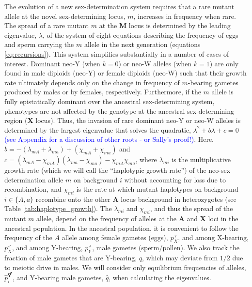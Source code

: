 \documentclass[10pt,letterpaper]{article}
\begin{document}
The evolution of a new sex-determination system requires that a rare mutant allele at the novel sex-determining locus, $m$, increases in frequency when rare. 
The spread of a rare mutant $m$ at the \textbf{M} locus is determined by the leading eigenvalue, $\lambda$, of the system of eight equations describing the frequency of eggs and sperm carrying the $m$ allele in the next generation (equations \ref{eq:recursions}). %
This system simplifies substantially in a number of cases of interest. 
Dominant neo-Y (when $k=0$) or neo-W alleles (when $k=1$) are only found in male diploids (neo-Y) or female diploids (neo-W) such that their growth rate ultimately depends only on the change in frequency of $m$-bearing gametes produced by males or by females, respectively. 
Furthermore, if the $m$ allele is fully epistatically dominant over the ancestral sex-determining system, phenotypes are not affected by the genotype at the ancestral sex-determining region (\textbf{X} locus). 
Thus, the invasion of rare dominant neo-Y or neo-W alleles is determined by the largest eigenvalue that solves the quadratic, $\lambda^2+ b \lambda + c =0$ \textcolor{blue}{(see Appendix for a discussion of other roots - or Sally's proof!)}.
Here, $b= - (\lambda_{mA} + \lambda_{ma})+(\chi_{mA} + \chi_{ma})$ and $c = (\lambda_{mA}-\chi_{mA}) (\lambda_{ma}-\chi_{ma}) -\chi_{mA} \chi_{ma}$, where $\lambda_{mi}$ is the multiplicative growth rate (which we will call the ``haplotypic growth rate'') of the neo-sex determination allele $m$ on background $i$ without accounting for loss due to recombination, and $\chi_{mi}$ is the rate at which mutant haplotypes on background $i\in\{A,a\}$ recombine onto the other \textbf{A} locus background in heterozygotes (see Table \ref{tab:haplotype_growth}).
The $\lambda_{mi}$ and $\chi_{mi}$, and thus the spread of the mutant $m$ allele, depend on the frequency of alleles at the \textbf{A} and \textbf{X} loci in the ancestral population. 
In the ancestral population, it is convenient to follow the frequency of the $A$ allele among female gametes (eggs), $p^\female_X$, and among X-bearing, $p^\male_X$, and among Y-bearing, $p^\male_Y$, male gametes (sperm/pollen). 
We also track the fraction of male gametes that are Y-bearing, $q$, which may deviate from $1/2$ due to meiotic drive in males. 
We will consider only equilibrium frequencies of alleles, $\hat{p}^\Hermaphrodite_i$, and Y-bearing male gametes, $\hat{q}$, when calculating the eigenvalues.  
\end{document}
